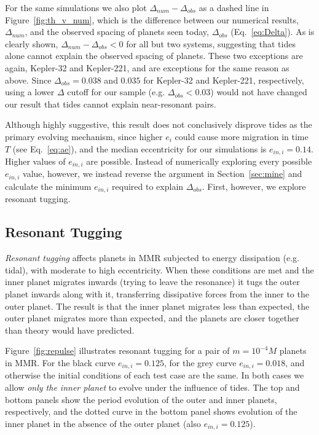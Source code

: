 For the same simulations we also plot $\Delta_{num} - \Delta_{obs}$ as a dashed line in Figure~\ref{fig:th_v_num}, which is the difference between our numerical results, $\Delta_{num}$, and the observed spacing of \kep{} planets seen today, $\Delta_{obs}$ (Eq.~\ref{eq:Delta}). 
As is clearly shown, $\Delta_{num} - \Delta_{obs} < 0$ for all but two systems, suggesting that tides alone cannot explain the observed spacing of \kep{} planets.
These two exceptions are again, Kepler-32 and Kepler-221, and are exceptions for the same reason as above. 
Since $\Delta_{obs} = 0.038$ and $0.035$ for Kepler-32 and Kepler-221, respectively, using a lower $\Delta$ cutoff for our \kep{} sample (e.g. $\Delta_{obs} < 0.03$) would not have changed our result that tides cannot explain near-resonant pairs.

Although highly suggestive, this result does not conclusively disprove tides as the primary evolving mechanism, since higher $e_i$ could cause more migration in time $T$ (see Eq.~\ref{eq:ae}), and the median eccentricity for our simulations is $e_{in,i} = 0.14$. 
Higher values of $e_{in,i}$ are possible. 
Instead of numerically exploring every possible $e_{in,i}$ value, however, we instead reverse the argument in Section~\ref{sec:mine} and calculate the minimum $e_{in,i}$ required to explain $\Delta_{obs}$.
First, however, we explore resonant tugging. 

\subsection{Resonant Tugging}
\label{sec:restugg}
\textit{Resonant tugging} affects planets in MMR subjected to energy dissipation (e.g. tidal), with moderate to high eccentricity. 
When these conditions are met and the inner planet migrates inwards (trying to leave the resonance) it tugs the outer planet inwards along with it, transferring dissipative forces from the inner to the outer planet.
The result is that the inner planet migrates less than expected, the outer planet migrates more than expected, and the planets are closer together than theory would have predicted.

Figure~\ref{fig:repulse} illustrates resonant tugging for a pair of $m = 10^{-4}M$ planets in MMR.  
For the black curve $e_{in,i} = 0.125$, for the grey curve $e_{in,i} = 0.018$, and otherwise the initial conditions of each test case are the same.
In both cases we allow \textit{only the inner planet} to evolve under the influence of tides.
The top and bottom panels show the period evolution of the outer and inner planets, respectively, and the dotted curve in the bottom panel shows evolution of the inner planet in the absence of the outer planet (also $e_{in,i} = 0.125$).

